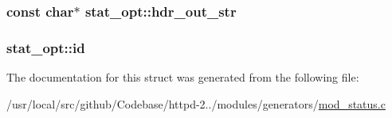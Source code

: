 \subsubsection[{\texorpdfstring{hdr\+\_\+out\+\_\+str}{hdr_out_str}}]{\setlength{\rightskip}{0pt plus 5cm}const char$\ast$ stat\+\_\+opt\+::hdr\+\_\+out\+\_\+str}\hypertarget{structstat__opt_abf474c351c6d2df11ad04f9757894988}{}\label{structstat__opt_abf474c351c6d2df11ad04f9757894988}
\subsubsection[{\texorpdfstring{id}{id}}]{ stat\+\_\+opt\+::id}\hypertarget{structstat__opt_a9d3de19e629c152a1dc989330b9f2d5d}{}\label{structstat__opt_a9d3de19e629c152a1dc989330b9f2d5d}


The documentation for this struct was generated from the following file\+:\begin{DoxyCompactItemize}
\item 
/usr/local/src/github/\+Codebase/httpd-\/2../modules/generators/\hyperlink{mod__status_8c}{mod\+\_\+status.\+c}\end{DoxyCompactItemize}
